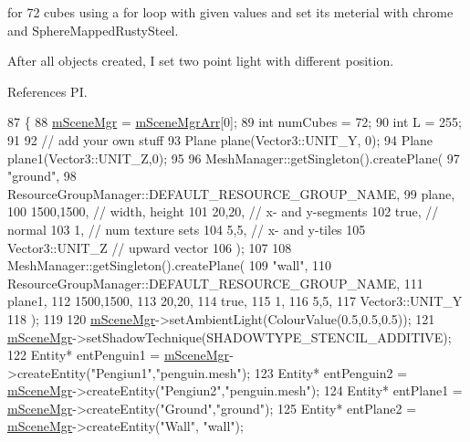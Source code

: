 for 72 cubes using a for loop with given values and set its meterial with chrome and Sphere\+Mapped\+Rusty\+Steel.

After all objects created, I set two point light with different position. 

References PI.


\begin{DoxyCode}
87 \{
88     \hyperlink{class_base_application_a8a7684f4f9a57ed3089048ad1a913b2d}{mSceneMgr} = \hyperlink{class_basic_tutorial__00_a603779b6087698c57b7989e16d8a9b93}{mSceneMgrArr}[0];
89     \textcolor{keywordtype}{int} numCubes = 72;
90     \textcolor{keywordtype}{int} L = 255;
91 
92     \textcolor{comment}{// add your own stuff}
93     Plane plane(Vector3::UNIT\_Y, 0);
94     Plane plane1(Vector3::UNIT\_Z,0);
95 
96     MeshManager::getSingleton().createPlane(
97         \textcolor{stringliteral}{"ground"},
98         ResourceGroupManager::DEFAULT\_RESOURCE\_GROUP\_NAME,
99         plane,
100         1500,1500, \textcolor{comment}{// width, height}
101         20,20, \textcolor{comment}{// x- and y-segments}
102         \textcolor{keyword}{true}, \textcolor{comment}{// normal}
103         1, \textcolor{comment}{// num texture sets}
104         5,5, \textcolor{comment}{// x- and y-tiles}
105         Vector3::UNIT\_Z \textcolor{comment}{// upward vector}
106     ); 
107 
108      MeshManager::getSingleton().createPlane(
109         \textcolor{stringliteral}{"wall"},
110         ResourceGroupManager::DEFAULT\_RESOURCE\_GROUP\_NAME,
111         plane1,
112         1500,1500,
113         20,20,
114         \textcolor{keyword}{true},
115         1,
116         5,5,
117         Vector3::UNIT\_Y
118     );
119 
120     \hyperlink{class_base_application_a8a7684f4f9a57ed3089048ad1a913b2d}{mSceneMgr}->setAmbientLight(ColourValue(0.5,0.5,0.5));
121     \hyperlink{class_base_application_a8a7684f4f9a57ed3089048ad1a913b2d}{mSceneMgr}->setShadowTechnique(SHADOWTYPE\_STENCIL\_ADDITIVE);
122     Entity* entPenguin1 = \hyperlink{class_base_application_a8a7684f4f9a57ed3089048ad1a913b2d}{mSceneMgr}->createEntity(\textcolor{stringliteral}{"Pengiun1"},\textcolor{stringliteral}{"penguin.mesh"});
123     Entity* entPenguin2 = \hyperlink{class_base_application_a8a7684f4f9a57ed3089048ad1a913b2d}{mSceneMgr}->createEntity(\textcolor{stringliteral}{"Pengiun2"},\textcolor{stringliteral}{"penguin.mesh"});
124     Entity* entPlane1 = \hyperlink{class_base_application_a8a7684f4f9a57ed3089048ad1a913b2d}{mSceneMgr}->createEntity(\textcolor{stringliteral}{"Ground"},\textcolor{stringliteral}{"ground"});
125     Entity* entPlane2 = \hyperlink{class_base_application_a8a7684f4f9a57ed3089048ad1a913b2d}{mSceneMgr}->createEntity(\textcolor{stringliteral}{"Wall"}, \textcolor{stringliteral}{"wall"});

\end{DoxyCode}
